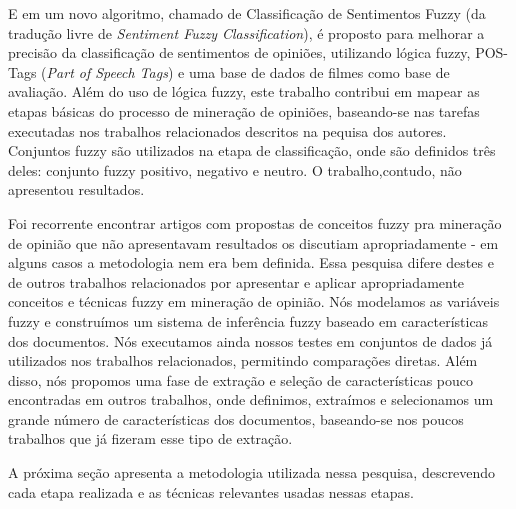 \documentclass[template.tex]{subfiles}
\begin{document}
E em  um novo algoritmo, chamado de Classificação de Sentimentos Fuzzy (da tradução livre de \textit{Sentiment Fuzzy Classification}), é proposto para melhorar a precisão da classificação de sentimentos de opiniões, utilizando lógica fuzzy, POS-Tags (\textit{Part of Speech Tags}) e uma base de dados de filmes como base de avaliação. Além do uso de lógica fuzzy, este trabalho contribui em mapear as etapas básicas do processo de mineração de opiniões, baseando-se nas tarefas executadas nos trabalhos relacionados descritos na pequisa dos autores. Conjuntos fuzzy são utilizados na etapa de classificação, onde são definidos três deles: conjunto fuzzy positivo, negativo e neutro. O trabalho,contudo, não apresentou resultados. 

Foi recorrente encontrar artigos com propostas de conceitos fuzzy pra mineração de opinião que não apresentavam resultados os discutiam apropriadamente - em alguns casos a metodologia nem era bem definida. Essa pesquisa difere destes e de outros trabalhos relacionados por apresentar e aplicar apropriadamente conceitos e técnicas fuzzy em mineração de opinião. Nós modelamos as variáveis fuzzy e construímos um sistema de inferência fuzzy baseado em características dos documentos. Nós executamos ainda nossos testes em conjuntos de dados já utilizados nos trabalhos relacionados, permitindo comparações diretas. Além disso, nós propomos uma fase de extração e seleção de características pouco encontradas em outros trabalhos, onde definimos, extraímos e selecionamos um grande número de características dos documentos, baseando-se nos poucos trabalhos que já fizeram esse tipo de extração.

A próxima seção apresenta a metodologia utilizada nessa pesquisa, descrevendo cada etapa realizada e as técnicas relevantes usadas nessas etapas.

\end{document}
